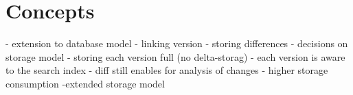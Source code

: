 \section{Concepts}
- extension to database model
	- linking version
	- storing differences
- decisions on storage model
	- storing each version full (no delta-storag)
	- each version is aware to the search index
	- diff still enables for analysis of changes
	- higher storage consumption
-extended storage model
